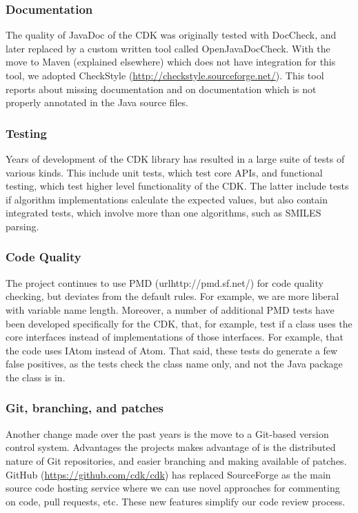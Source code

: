 \documentclass[10pt]{bmcart}
\begin{document}
  \subsubsection*{Documentation}

  The quality of JavaDoc of the CDK was originally tested with DocCheck, and
  later replaced by a custom written tool called OpenJavaDocCheck. With the move
  to Maven (explained elsewhere) which does not have integration for this tool,
  we adopted CheckStyle (\url{http://checkstyle.sourceforge.net/}). This tool
  reports about missing documentation and on documentation which is not properly
  annotated in the Java source files.

  \subsubsection*{Testing}

  Years of development of the CDK library has resulted in a large suite of
  tests of various kinds. This include unit tests, which test core APIs, and
  functional testing, which test higher level functionality of the CDK. The
  latter include tests if algorithm implementations calculate the expected
  values, but also contain integrated tests, which involve more than one
  algorithms, such as SMILES parsing.

  \subsubsection*{Code Quality}

The project continues to use PMD (url{http://pmd.sf.net/}) for code quality checking,
but deviates from the default rules. For example, we are more liberal with 
variable name length. Moreover, a number of additional PMD tests have been
developed specifically for the CDK, that, for example, test if a class uses
the core interfaces instead of implementations of those interfaces. For example,
that the code uses IAtom instead of Atom. That said, these tests do generate a
few false positives, as the tests check the class name only, and not the
Java package the class is in.

  \subsubsection*{Git, branching, and patches}

Another change made over the past years is the move to a Git-based version
control system. Advantages the projects makes advantage of is the distributed
nature of Git repositories, and easier branching and making available of
patches. GitHub (\url{https://github.com/cdk/cdk}) has replaced SourceForge
as the main source code hosting service
where we can use novel approaches for commenting on code, pull requests, etc.
These new features simplify our code review process.
\end{document}
